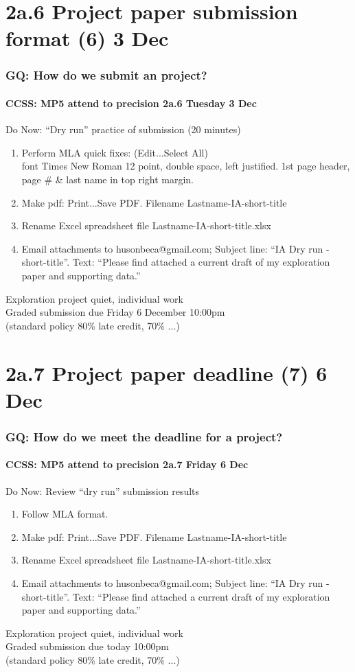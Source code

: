 \documentclass{beamer}
\begin{document}
\section{2a.6 Project paper submission format (6) 3 Dec}
\frame
{
  \frametitle{GQ: How do we submit an project?}
  \framesubtitle{CCSS: MP5 attend to precision \hfill \alert{2a.6 Tuesday 3 Dec}}
  \begin{block}{Do Now: ``Dry run'' practice of submission (20 minutes)}
    \begin{enumerate}
      \item Perform MLA quick fixes: (Edit...Select All) \\font Times New Roman 12 point, double space, left justified. 1st page header, page \# \& last name in top right margin.
      \item Make pdf: Print...Save PDF. Filename Lastname-IA-short-title
      \item Rename Excel spreadsheet file Lastname-IA-short-title.xlsx
      \item Email attachments to husonbeca@gmail.com; Subject line: ``IA Dry run - short-title''. Text: ``Please find attached a current draft of my exploration paper and supporting data.'' 
  \end{enumerate}
\end{block}

    Exploration project quiet, individual work\\[0.25cm]
    Graded submission \alert{due Friday 6 December 10:00pm} \\(standard policy 80\% late credit, 70\% ...)
}

\section{2a.7 Project paper deadline (7) 6 Dec}
\frame
{
  \frametitle{GQ: How do we meet the deadline for a project?}
  \framesubtitle{CCSS: MP5 attend to precision \hfill \alert{2a.7 Friday 6 Dec}}
  \begin{block}{Do Now: Review ``dry run'' submission results}
    \begin{enumerate}
      \item Follow MLA format.
      \item Make pdf: Print...Save PDF. Filename Lastname-IA-short-title
      \item Rename Excel spreadsheet file Lastname-IA-short-title.xlsx
      \item Email attachments to husonbeca@gmail.com; Subject line: ``IA Dry run - short-title''. Text: ``Please find attached a current draft of my exploration paper and supporting data.'' 
  \end{enumerate}
\end{block}

    Exploration project quiet, individual work\\[0.25cm]
    Graded submission \alert{due today 10:00pm} \\(standard policy 80\% late credit, 70\% ...)
}
\end{document}

